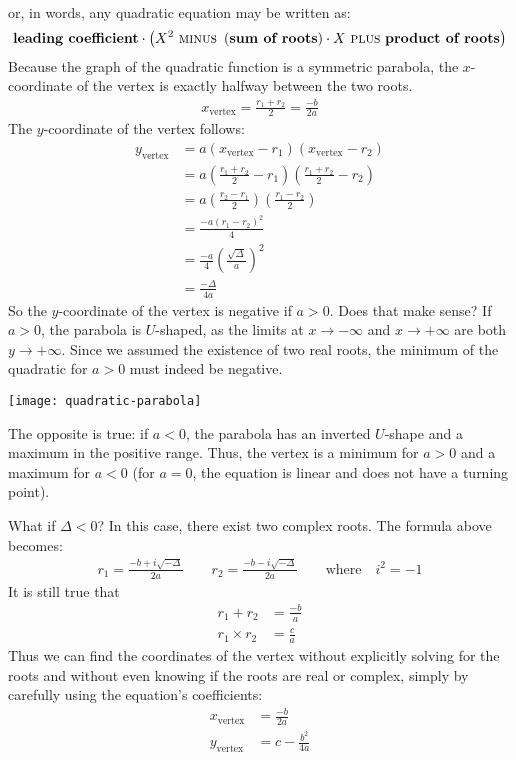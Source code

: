 \documentclass[12pt]{article}
\begin{document}
\begin{answer}
\begin{align*}
\end{align*}
or, in words, any quadratic equation may be written as:
\begin{align*}
\textbf{leading coefficient} \cdot \left(X^2 ~\textsc{minus}~ \left(\textbf{sum of roots}\right) \cdot X ~\textsc{plus}~ \textbf{product of roots} \right)
\end{align*}
Because the graph of the quadratic function is a symmetric parabola, the $x$-coordinate of the vertex is exactly halfway between the two roots.
\begin{align*}
x_{\text{vertex}} 
  = \frac{r_1+r_2}{2}
  = \frac{-b}{2a}
\end{align*}
The $y$-coordinate of the vertex follows: 
\begin{align*}
y_{\text{vertex}} 
  & = a (x_{\text{vertex}}-r_1)(x_{\text{vertex}}-r_2) \\
  & = a \left(\frac{r_1+r_2}{2}-r_1\right)\left(\frac{r_1+r_2}{2}-r_2\right) \\
  & = a \left(\frac{r_2-r_1}{2}\right)\left(\frac{r_1-r_2}{2}\right) \\
  & = \frac{-a\left(r_1-r_2\right)^2}{4} \\
  & = \frac{-a}{4}\left(\frac{\sqrt{\Delta}}{a}\right)^2 \\
  & = \frac{-\Delta}{4a}
\end{align*}
So the $y$-coordinate of the vertex is negative if $a>0$. Does that make sense? If $a>0$, the parabola is $U$-shaped, as the limits at $x\rightarrow-\infty$ and $x\rightarrow+\infty$ are both $y\rightarrow+\infty$. Since we assumed the existence of two real roots, the minimum of the quadratic for $a>0$ must indeed be negative. 
\begin{center}
\centering
\texttt{[image: quadratic-parabola]}
\end{center}
The opposite is true: if $a<0$, the parabola has an inverted $U$-shape and a maximum in the positive range. Thus, the vertex is a minimum for $a>0$ and a maximum for $a<0$ (for $a=0$, the equation is linear and does not have a turning point). 

What if $\Delta<0$? In this case, there exist two complex roots. The formula above becomes:
\begin{align*}
r_1 = \frac{-b+i\sqrt{-\Delta}}{2a}
  \qquad
r_2 = \frac{-b-i\sqrt{-\Delta}}{2a} 
  \qquad\text{where}\quad i^2 = -1
\end{align*}
It is still true that
\begin{align*}
r_1 + r_2 
  & = \frac{-b}{a} \\
r_1 \times r_2 
  & = \frac{c}{a}
\end{align*}
Thus we can find the coordinates of the vertex without explicitly solving for the roots and without even knowing if the roots are real or complex, simply by carefully using the equation's coefficients:
\begin{align*}
x_{\text{vertex}} & = \frac{-b}{2a} \\
y_{\text{vertex}} & = c - \frac{b^2}{4a}
\end{align*}
\end{answer}
\end{document}
